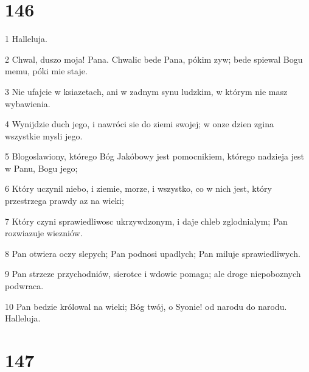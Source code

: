 \chapter{146}

\par 1 Halleluja.
\par 2 Chwal, duszo moja! Pana. Chwalic bede Pana, pókim zyw; bede spiewal Bogu memu, póki mie staje.
\par 3 Nie ufajcie w ksiazetach, ani w zadnym synu ludzkim, w którym nie masz wybawienia.
\par 4 Wynijdzie duch jego, i nawróci sie do ziemi swojej; w onze dzien zgina wszystkie mysli jego.
\par 5 Blogoslawiony, którego Bóg Jakóbowy jest pomocnikiem, którego nadzieja jest w Panu, Bogu jego;
\par 6 Który uczynil niebo, i ziemie, morze, i wszystko, co w nich jest, który przestrzega prawdy az na wieki;
\par 7 Który czyni sprawiedliwosc ukrzywdzonym, i daje chleb zglodnialym; Pan rozwiazuje wiezniów.
\par 8 Pan otwiera oczy slepych; Pan podnosi upadlych; Pan miluje sprawiedliwych.
\par 9 Pan strzeze przychodniów, sierotce i wdowie pomaga; ale droge niepoboznych podwraca.
\par 10 Pan bedzie królowal na wieki; Bóg twój, o Syonie! od narodu do narodu. Halleluja.

\chapter{147}

